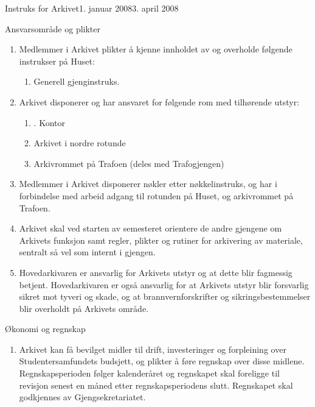 \begin{instruks}{Instruks for Arkivet}{1. januar 2008}{3. april 2008}
    \begin{instruksledd}{Ansvarsområde og plikter}
        \begin{enumerate}
            \item Medlemmer i Arkivet plikter å kjenne innholdet av og overholde følgende instrukser
                på Huset:
                \begin{enumerate}
                        \item Generell gjenginstruks.
                \end{enumerate}
            \item Arkivet disponerer og har ansvaret for følgende rom med tilhørende utstyr:
                \begin{enumerate}
                    \item. Kontor
                    \item Arkivet i nordre rotunde
                    \item Arkivrommet på Trafoen (deles med Trafogjengen)
                \end{enumerate}
            \item Medlemmer i Arkivet disponerer nøkler etter nøkkelinstruks, og har i forbindelse
                 med arbeid adgang til rotunden på Huset, og arkivrommet på Trafoen.
            \item Arkivet skal ved starten av semesteret orientere de andre gjengene om Arkivets
                 funksjon samt regler, plikter og rutiner for arkivering av materiale, sentralt så vel som internt i gjengen.
             \item Hovedarkivaren er ansvarlig for Arkivets utstyr og at dette blir fagmessig
                 betjent. Hovedarkivaren er også ansvarlig for at Arkivets utstyr blir forsvarlig sikret mot tyveri og skade, og at
                 brannvernforskrifter og sikringsbestemmelser blir overholdt på Arkivets område.
         \end{enumerate}
     \end{instruksledd}

     \begin{instruksledd}{Økonomi og regnskap}
         \begin{enumerate}
             \item Arkivet kan få bevilget midler til drift, investeringer og forpleining over
                 Studentersamfundets budsjett, og plikter å føre regnskap over disse midlene. Regnskapsperioden følger kalenderåret og
                regnskapet skal foreligge til revisjon senest en måned etter regnskapsperiodens slutt. Regnskapet
                skal godkjennes av Gjengsekretariatet.
        \end{enumerate}
    \end{instruksledd}
    

\end{instruks}
